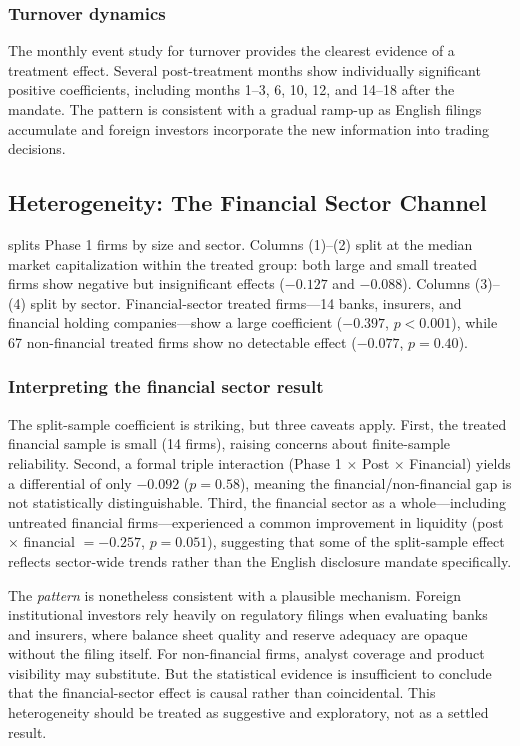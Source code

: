 \documentclass[12pt]{article}
\begin{document}
\subsubsection*{Turnover dynamics} The monthly event study for turnover provides the clearest evidence of a treatment effect. Several post-treatment months show individually significant positive coefficients, including months 1--3, 6, 10, 12, and 14--18 after the mandate. The pattern is consistent with a gradual ramp-up as English filings accumulate and foreign investors incorporate the new information into trading decisions.

\subsection{Heterogeneity: The Financial Sector Channel}



 splits Phase 1 firms by size and sector. Columns (1)--(2) split at the median market capitalization within the treated group: both large and small treated firms show negative but insignificant effects ($-0.127$ and $-0.088$). Columns (3)--(4) split by sector. Financial-sector treated firms---14 banks, insurers, and financial holding companies---show a large coefficient ($-0.397$, $p < 0.001$), while 67 non-financial treated firms show no detectable effect ($-0.077$, $p = 0.40$).

\subsubsection*{Interpreting the financial sector result} The split-sample coefficient is striking, but three caveats apply. First, the treated financial sample is small (14 firms), raising concerns about finite-sample reliability. Second, a formal triple interaction (Phase 1 $\times$ Post $\times$ Financial) yields a differential of only $-0.092$ ($p = 0.58$), meaning the financial/non-financial gap is not statistically distinguishable. Third, the financial sector as a whole---including untreated financial firms---experienced a common improvement in liquidity (post $\times$ financial $= -0.257$, $p = 0.051$), suggesting that some of the split-sample effect reflects sector-wide trends rather than the English disclosure mandate specifically.

The \emph{pattern} is nonetheless consistent with a plausible mechanism. Foreign institutional investors rely heavily on regulatory filings when evaluating banks and insurers, where balance sheet quality and reserve adequacy are opaque without the filing itself. For non-financial firms, analyst coverage and product visibility may substitute. But the statistical evidence is insufficient to conclude that the financial-sector effect is causal rather than coincidental. This heterogeneity should be treated as suggestive and exploratory, not as a settled result.
\end{document}
